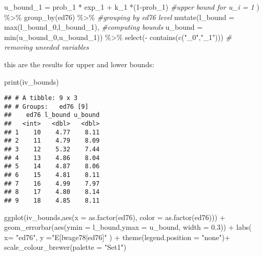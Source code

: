 \documentclass[
]{article}
\newenvironment{Shaded}{\begin{snugshade}}{\end{snugshade}}
\newcommand{\AttributeTok}[1]{\textcolor[rgb]{0.77,0.63,0.00}{#1}}
\newcommand{\CommentTok}[1]{\textcolor[rgb]{0.56,0.35,0.01}{\textit{#1}}}
\newcommand{\DecValTok}[1]{\textcolor[rgb]{0.00,0.00,0.81}{#1}}
\newcommand{\FloatTok}[1]{\textcolor[rgb]{0.00,0.00,0.81}{#1}}
\newcommand{\FunctionTok}[1]{\textcolor[rgb]{0.00,0.00,0.00}{#1}}
\newcommand{\NormalTok}[1]{#1}
\newcommand{\SpecialCharTok}[1]{\textcolor[rgb]{0.00,0.00,0.00}{#1}}
\newcommand{\StringTok}[1]{\textcolor[rgb]{0.31,0.60,0.02}{#1}}
\begin{document}
\begin{Shaded}
\begin{Highlighting}[]
      \AttributeTok{u\_bound\_1 =}\NormalTok{ prob\_1 }\SpecialCharTok{*}\NormalTok{ exp\_1 }\SpecialCharTok{+}\NormalTok{ k\_1 }\SpecialCharTok{*}\NormalTok{(}\DecValTok{1}\SpecialCharTok{{-}}\NormalTok{prob\_1)  }\CommentTok{\#upper bound for u\_i = 1}
\NormalTok{      ) }\SpecialCharTok{\%\textgreater{}\%}
    \FunctionTok{group\_by}\NormalTok{(ed76) }\SpecialCharTok{\%\textgreater{}\%}                              \CommentTok{\#grouping by ed76 level}
    \FunctionTok{mutate}\NormalTok{(}\AttributeTok{l\_bound =} \FunctionTok{max}\NormalTok{(l\_bound\_0,l\_bound\_1),      }\CommentTok{\#computing bounds}
           \AttributeTok{u\_bound =} \FunctionTok{min}\NormalTok{(u\_bound\_0,u\_bound\_1)) }\SpecialCharTok{\%\textgreater{}\%} 
    \FunctionTok{select}\NormalTok{(}\SpecialCharTok{{-}} \FunctionTok{contains}\NormalTok{(}\FunctionTok{c}\NormalTok{(}\StringTok{"\_0"}\NormalTok{,}\StringTok{"\_1"}\NormalTok{))) }\CommentTok{\# removing uneeded variables}
\end{Highlighting}
\end{Shaded}

this are the results for upper and lower bounds:

\begin{Shaded}
\begin{Highlighting}[]
\FunctionTok{print}\NormalTok{(iv\_bounds)}
\end{Highlighting}
\end{Shaded}

\begin{verbatim}
## # A tibble: 9 x 3
## # Groups:   ed76 [9]
##    ed76 l_bound u_bound
##   <int>   <dbl>   <dbl>
## 1    10    4.77    8.11
## 2    11    4.79    8.09
## 3    12    5.32    7.44
## 4    13    4.86    8.04
## 5    14    4.87    8.06
## 6    15    4.81    8.11
## 7    16    4.99    7.97
## 8    17    4.80    8.14
## 9    18    4.85    8.11
\end{verbatim}

\begin{Shaded}
\begin{Highlighting}[]
\FunctionTok{ggplot}\NormalTok{(iv\_bounds,}\FunctionTok{aes}\NormalTok{(}\AttributeTok{x =} \FunctionTok{as.factor}\NormalTok{(ed76), }\AttributeTok{color =} \FunctionTok{as.factor}\NormalTok{(ed76))) }\SpecialCharTok{+}
  \FunctionTok{geom\_errorbar}\NormalTok{(}\FunctionTok{aes}\NormalTok{(}\AttributeTok{ymin =}\NormalTok{ l\_bound,}\AttributeTok{ymax =}\NormalTok{ u\_bound, }\AttributeTok{width =} \FloatTok{0.3}\NormalTok{)) }\SpecialCharTok{+}
  \FunctionTok{labs}\NormalTok{( }\AttributeTok{x=} \StringTok{"ed76"}\NormalTok{, }\AttributeTok{y =}\StringTok{"E[lwage78|ed76]"}\NormalTok{ ) }\SpecialCharTok{+}
  \FunctionTok{theme}\NormalTok{(}\AttributeTok{legend.position =} \StringTok{"none"}\NormalTok{)}\SpecialCharTok{+}
   \FunctionTok{scale\_colour\_brewer}\NormalTok{(}\AttributeTok{palette =} \StringTok{"Set1"}\NormalTok{) }
\end{Highlighting}
\end{Shaded}
\end{document}
